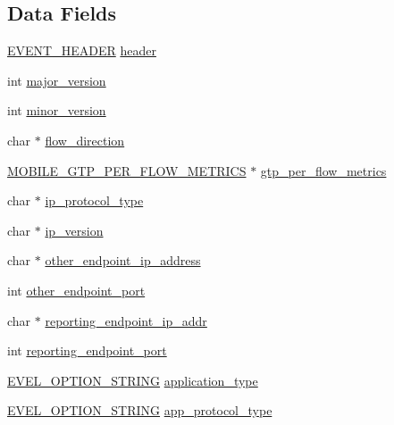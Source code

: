 \subsection*{Data Fields}
\begin{DoxyCompactItemize}
\item 
\hyperlink{evel_8h_aa0ea94c675729365ea7825c4fc7e06d8}{E\+V\+E\+N\+T\+\_\+\+H\+E\+A\+D\+ER} \hyperlink{structevent__mobile__flow_a212b03fad1a17580856482ca19d57a3c}{header}
\item 
int \hyperlink{structevent__mobile__flow_a1cc484e20bd04bd631663af83f32df23}{major\+\_\+version}
\item 
int \hyperlink{structevent__mobile__flow_ac1abe71a2434db6c55850ee9a0585d20}{minor\+\_\+version}
\item 
char $\ast$ \hyperlink{structevent__mobile__flow_a472089128d0ed271f48da03b12ea1135}{flow\+\_\+direction}
\item 
\hyperlink{evel_8h_aab323a610a0d9f5df6ebb82f7e060494}{M\+O\+B\+I\+L\+E\+\_\+\+G\+T\+P\+\_\+\+P\+E\+R\+\_\+\+F\+L\+O\+W\+\_\+\+M\+E\+T\+R\+I\+CS} $\ast$ \hyperlink{structevent__mobile__flow_ab3248c7c5ccc0a61e2e2156ac096590d}{gtp\+\_\+per\+\_\+flow\+\_\+metrics}
\item 
char $\ast$ \hyperlink{structevent__mobile__flow_a546ae51e6d62dd9498bfe88546822df7}{ip\+\_\+protocol\+\_\+type}
\item 
char $\ast$ \hyperlink{structevent__mobile__flow_a3e45a01a9a8a6bd039d767dd7c385229}{ip\+\_\+version}
\item 
char $\ast$ \hyperlink{structevent__mobile__flow_ae171ca99234cc84f807d4bc8a71769ed}{other\+\_\+endpoint\+\_\+ip\+\_\+address}
\item 
int \hyperlink{structevent__mobile__flow_a792df4bd771831bbca3bf062d611a0c8}{other\+\_\+endpoint\+\_\+port}
\item 
char $\ast$ \hyperlink{structevent__mobile__flow_a3e8c90cb39bd903229c8af4d66a2ae99}{reporting\+\_\+endpoint\+\_\+ip\+\_\+addr}
\item 
int \hyperlink{structevent__mobile__flow_a58808b53f7850104c2d978f6884dfe01}{reporting\+\_\+endpoint\+\_\+port}
\item 
\hyperlink{evel_8h_a0de5113a7b72de93c0c7b644f7ea7ec3}{E\+V\+E\+L\+\_\+\+O\+P\+T\+I\+O\+N\+\_\+\+S\+T\+R\+I\+NG} \hyperlink{structevent__mobile__flow_a25248fddf2e96c1692b26b7c5247cc30}{application\+\_\+type}
\item 
\hyperlink{evel_8h_a0de5113a7b72de93c0c7b644f7ea7ec3}{E\+V\+E\+L\+\_\+\+O\+P\+T\+I\+O\+N\+\_\+\+S\+T\+R\+I\+NG} \hyperlink{structevent__mobile__flow_a6e64b8dd7f8a2ddc9b74978f1eb35227}{app\+\_\+protocol\+\_\+type}

\end{DoxyCompactItemize}
